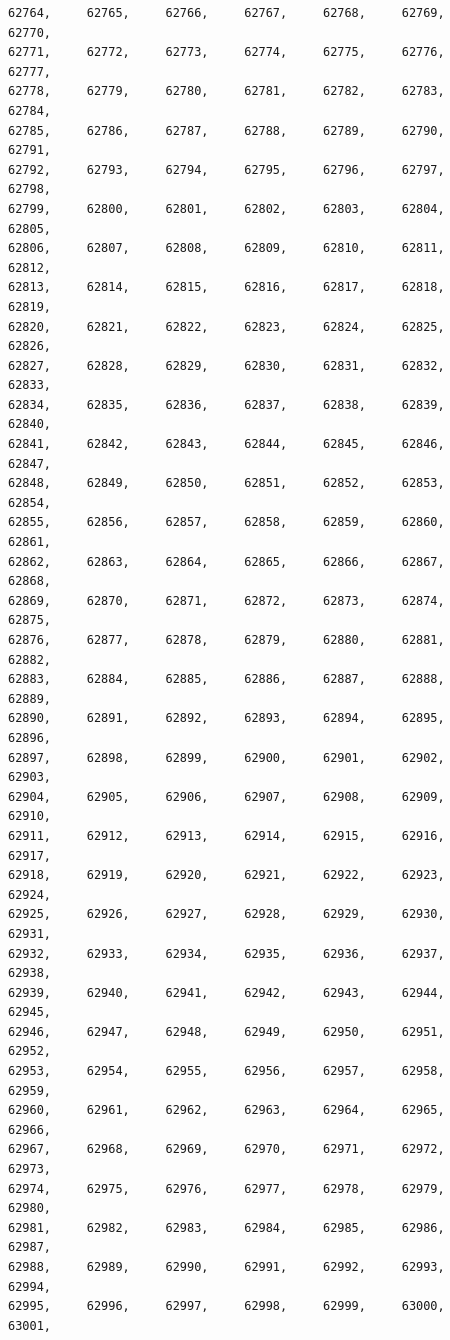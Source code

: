 \documentclass[a4paper,11pt]{report}
\begin{document}
\begin{verbatim}
62764,     62765,     62766,     62767,     62768,     62769,     62770,     
62771,     62772,     62773,     62774,     62775,     62776,     62777,     
62778,     62779,     62780,     62781,     62782,     62783,     62784,     
62785,     62786,     62787,     62788,     62789,     62790,     62791,     
62792,     62793,     62794,     62795,     62796,     62797,     62798,     
62799,     62800,     62801,     62802,     62803,     62804,     62805,     
62806,     62807,     62808,     62809,     62810,     62811,     62812,     
62813,     62814,     62815,     62816,     62817,     62818,     62819,     
62820,     62821,     62822,     62823,     62824,     62825,     62826,     
62827,     62828,     62829,     62830,     62831,     62832,     62833,     
62834,     62835,     62836,     62837,     62838,     62839,     62840,     
62841,     62842,     62843,     62844,     62845,     62846,     62847,     
62848,     62849,     62850,     62851,     62852,     62853,     62854,     
62855,     62856,     62857,     62858,     62859,     62860,     62861,     
62862,     62863,     62864,     62865,     62866,     62867,     62868,     
62869,     62870,     62871,     62872,     62873,     62874,     62875,     
62876,     62877,     62878,     62879,     62880,     62881,     62882,     
62883,     62884,     62885,     62886,     62887,     62888,     62889,     
62890,     62891,     62892,     62893,     62894,     62895,     62896,     
62897,     62898,     62899,     62900,     62901,     62902,     62903,     
62904,     62905,     62906,     62907,     62908,     62909,     62910,     
62911,     62912,     62913,     62914,     62915,     62916,     62917,     
62918,     62919,     62920,     62921,     62922,     62923,     62924,     
62925,     62926,     62927,     62928,     62929,     62930,     62931,     
62932,     62933,     62934,     62935,     62936,     62937,     62938,     
62939,     62940,     62941,     62942,     62943,     62944,     62945,     
62946,     62947,     62948,     62949,     62950,     62951,     62952,     
62953,     62954,     62955,     62956,     62957,     62958,     62959,     
62960,     62961,     62962,     62963,     62964,     62965,     62966,     
62967,     62968,     62969,     62970,     62971,     62972,     62973,     
62974,     62975,     62976,     62977,     62978,     62979,     62980,     
62981,     62982,     62983,     62984,     62985,     62986,     62987,     
62988,     62989,     62990,     62991,     62992,     62993,     62994,     
62995,     62996,     62997,     62998,     62999,     63000,     63001,     

\end{verbatim}
\end{document}
